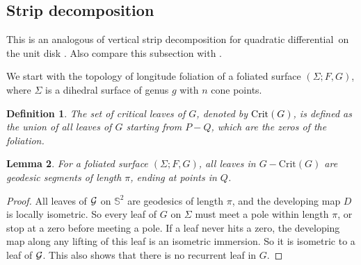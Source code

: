 \documentclass[pdflatex,sn-mathphys]{sn-jnl}%
\numberwithin{equation}{section}
\theoremstyle{thmstyleone}%
\newtheorem{theorem}{Theorem}[section]%
\newtheorem{definition}[theorem]{Definition}
\newtheorem{lemma}[theorem]{Lemma}
\newcommand{\pt}{\partial}
\newcommand{\STwo}{\mathbb{S}^2}
\newcommand{\Pcr}{Poincar\'{e}}
\newcommand{\mfoli}{measured foliation}
\newcommand{\qdf}{quadratic differential}
\newcommand{\SYM}{\textcolor{black}}
\newcommand{\DEF}{\emph}
\begin{document}
\subsection{Strip decomposition}\label{sec:strip_decomp}
This is an analogous of vertical strip decomposition for \qdf\ on the unit disk \cite[Section 19]{Strebel}. Also compare this subsection with \cite[Section 4]{WWX22axv}.

We start with the topology of longitude foliation of a foliated surface $(\Sigma;F,G)$, where $\Sigma$ is a dihedral surface of genus $g$ with $n$ cone points.

\newcommand{\SingF}{\mathrm{Crit}(F)}
\newcommand{\SingG}{\mathrm{Crit}(G)}
\begin{definition}\label{def:Sing_G}
    The set of \DEF{critical leaves} of $G$, denoted by \SYM{$\SingG$}, is defined as the union of all leaves of $G$ starting from $P-Q$, which are the zeros of the foliation.
\end{definition}

\begin{lemma}\label{lem:Sing_G}
    For a foliated surface $(\Sigma;F,G)$, all leaves in $G-\SingG$ are geodesic segments of length $\pi$, ending at points in $Q$.
\end{lemma}
\begin{proof}
    All leaves of $\mathcal{G}$ on $\STwo$ are geodesics of length $\pi$, and the developing map $D$ is locally isometric. So every leaf of $G$ on $\Sigma$ must meet a pole within length $\pi$, or stop at a zero before meeting a pole. If a leaf never hits a zero, the developing map along any lifting of this leaf is an isometric immersion. So it is isometric to a leaf of $\mathcal{G}$. This also shows that there is no recurrent leaf in $G$.
\end{proof}
\end{document}
